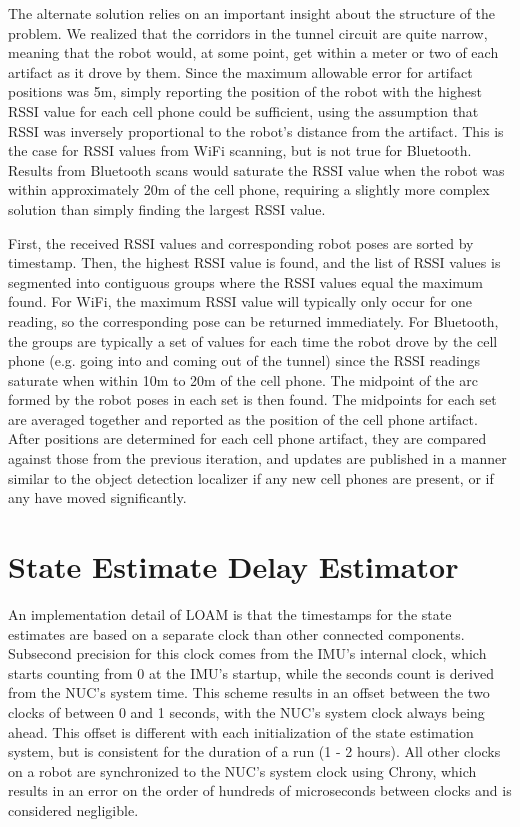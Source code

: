 The alternate solution relies on an important insight about the structure of the problem. We realized that the corridors in the tunnel circuit are quite narrow, meaning that the robot would, at some point, get within a meter or two of each artifact as it drove by them. Since the maximum allowable error for artifact positions was 5m, simply reporting the position of the robot with the highest RSSI value for each cell phone could be sufficient, using the assumption that RSSI was inversely proportional to the robot's distance from the artifact. This is the case for RSSI values from WiFi scanning, but is not true for Bluetooth. Results from Bluetooth scans would saturate the RSSI value when the robot was within approximately 20m of the cell phone, requiring a slightly more complex solution than simply finding the largest RSSI value.
	
First, the received RSSI values and corresponding robot poses are sorted by timestamp. Then, the highest RSSI value is found, and the list of RSSI values is segmented into contiguous groups where the RSSI values equal the maximum found. For WiFi, the maximum RSSI value will typically only occur for one  reading, so the corresponding pose can be returned immediately. For Bluetooth, the groups are typically a set of values for each time the robot drove by the cell phone (e.g. going into and coming out of the tunnel) since the RSSI readings saturate when within 10m to 20m of the cell phone. The midpoint of the arc formed by the robot poses in each set is then found. The midpoints for each set are averaged together and reported as the position of the cell phone artifact. After positions are determined for each cell phone artifact, they are compared against those from the previous iteration, and updates are published in a manner similar to the object detection localizer if any new cell phones are present, or if any have moved significantly.


\section{State Estimate Delay Estimator}

An implementation detail of LOAM is that the timestamps for the state estimates are based on a separate clock than other connected components. Subsecond precision for this clock comes from the IMU's internal clock, which starts counting from 0 at the IMU's startup, while the seconds count is derived from the NUC's system time. This scheme results in an offset between the two clocks of between 0 and 1 seconds, with the NUC's system clock always being ahead. This offset is different with each initialization of the state estimation system, but is consistent for the duration of a run (1 - 2 hours). All other clocks on a robot are synchronized to the NUC's system clock using Chrony, which results in an error on the order of hundreds of microseconds between clocks and is considered negligible.

